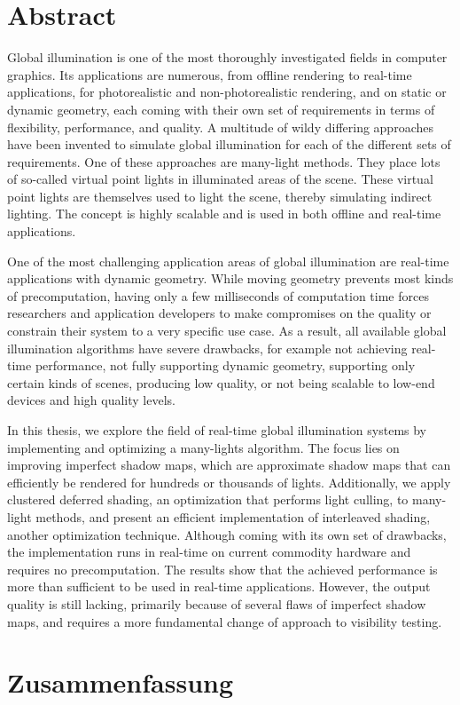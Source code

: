 
\chapter*{Abstract}

Global illumination is one of the most thoroughly investigated fields in computer graphics. Its applications are numerous, from offline rendering to real-time applications, for photorealistic and non-photorealistic rendering, and on static or dynamic geometry, each coming with their own set of requirements in terms of flexibility, performance, and quality. A multitude of wildy differing approaches have been invented to simulate global illumination for each of the different sets of requirements. One of these approaches are many-light methods. They place lots of so-called virtual point lights in illuminated areas of the scene. These virtual point lights are themselves used to light the scene, thereby simulating indirect lighting. The concept is highly scalable and is used in both offline and real-time applications.

One of the most challenging application areas of global illumination are real-time applications with dynamic geometry. While moving geometry prevents most kinds of precomputation, having only a few milliseconds of computation time forces researchers and application developers to make compromises on the quality or constrain their system to a very specific use case. As a result, all available global illumination algorithms have severe drawbacks, for example not achieving real-time performance, not fully supporting dynamic geometry, supporting only certain kinds of scenes, producing low quality, or not being scalable to low-end devices and high quality levels.

In this thesis, we explore the field of real-time global illumination systems by implementing and optimizing a many-lights algorithm. The focus lies on improving imperfect shadow maps, which are approximate shadow maps that can efficiently be rendered for hundreds or thousands of lights. Additionally, we apply clustered deferred shading, an optimization that performs light culling, to many-light methods, and present an efficient implementation of interleaved shading, another optimization technique. Although coming with its own set of drawbacks, the implementation runs in real-time on current commodity hardware and requires no precomputation. The results show that the achieved performance is more than sufficient to be used in real-time applications. However, the output quality is still lacking, primarily because of several flaws of imperfect shadow maps, and requires a more fundamental change of approach to visibility testing.

\chapter*{Zusammenfassung}

\cleardoublepage
